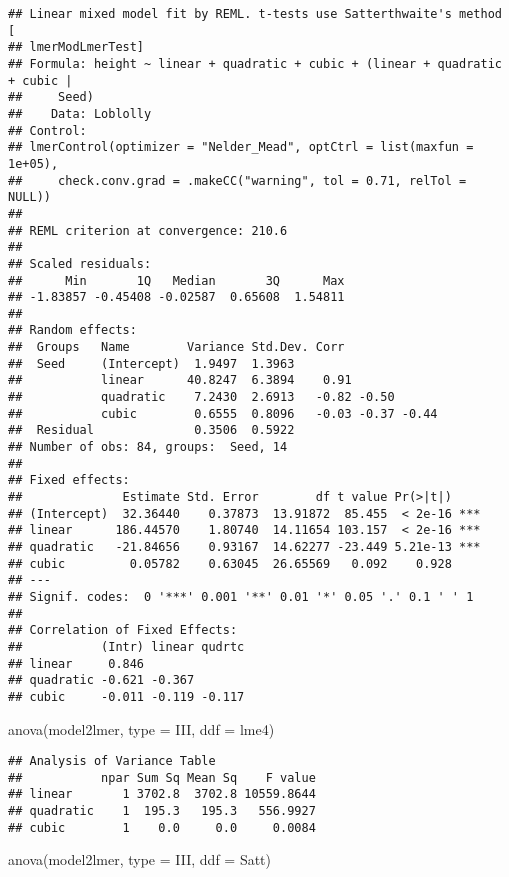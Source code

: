 \documentclass[
]{book}
\newenvironment{Shaded}{\begin{snugshade}}{\end{snugshade}}
\newcommand{\AttributeTok}[1]{\textcolor[rgb]{0.77,0.63,0.00}{#1}}
\newcommand{\FunctionTok}[1]{\textcolor[rgb]{0.00,0.00,0.00}{#1}}
\newcommand{\NormalTok}[1]{#1}
\newcommand{\StringTok}[1]{\textcolor[rgb]{0.31,0.60,0.02}{#1}}
\begin{document}
\begin{verbatim}
## Linear mixed model fit by REML. t-tests use Satterthwaite's method [
## lmerModLmerTest]
## Formula: height ~ linear + quadratic + cubic + (linear + quadratic + cubic |  
##     Seed)
##    Data: Loblolly
## Control: 
## lmerControl(optimizer = "Nelder_Mead", optCtrl = list(maxfun = 1e+05),  
##     check.conv.grad = .makeCC("warning", tol = 0.71, relTol = NULL))
## 
## REML criterion at convergence: 210.6
## 
## Scaled residuals: 
##      Min       1Q   Median       3Q      Max 
## -1.83857 -0.45408 -0.02587  0.65608  1.54811 
## 
## Random effects:
##  Groups   Name        Variance Std.Dev. Corr             
##  Seed     (Intercept)  1.9497  1.3963                    
##           linear      40.8247  6.3894    0.91            
##           quadratic    7.2430  2.6913   -0.82 -0.50      
##           cubic        0.6555  0.8096   -0.03 -0.37 -0.44
##  Residual              0.3506  0.5922                    
## Number of obs: 84, groups:  Seed, 14
## 
## Fixed effects:
##              Estimate Std. Error        df t value Pr(>|t|)    
## (Intercept)  32.36440    0.37873  13.91872  85.455  < 2e-16 ***
## linear      186.44570    1.80740  14.11654 103.157  < 2e-16 ***
## quadratic   -21.84656    0.93167  14.62277 -23.449 5.21e-13 ***
## cubic         0.05782    0.63045  26.65569   0.092    0.928    
## ---
## Signif. codes:  0 '***' 0.001 '**' 0.01 '*' 0.05 '.' 0.1 ' ' 1
## 
## Correlation of Fixed Effects:
##           (Intr) linear qudrtc
## linear     0.846              
## quadratic -0.621 -0.367       
## cubic     -0.011 -0.119 -0.117
\end{verbatim}

\begin{Shaded}
\begin{Highlighting}[]
\FunctionTok{anova}\NormalTok{(model2lmer, }\AttributeTok{type =} \StringTok{\textquotesingle{}III\textquotesingle{}}\NormalTok{, }\AttributeTok{ddf =} \StringTok{\textquotesingle{}lme4\textquotesingle{}}\NormalTok{)}
\end{Highlighting}
\end{Shaded}

\begin{verbatim}
## Analysis of Variance Table
##           npar Sum Sq Mean Sq    F value
## linear       1 3702.8  3702.8 10559.8644
## quadratic    1  195.3   195.3   556.9927
## cubic        1    0.0     0.0     0.0084
\end{verbatim}

\begin{Shaded}
\begin{Highlighting}[]
\FunctionTok{anova}\NormalTok{(model2lmer, }\AttributeTok{type =} \StringTok{\textquotesingle{}III\textquotesingle{}}\NormalTok{, }\AttributeTok{ddf =} \StringTok{\textquotesingle{}Satt\textquotesingle{}}\NormalTok{)}
\end{Highlighting}
\end{Shaded}
\end{document}
